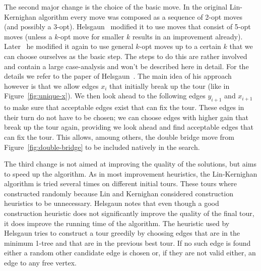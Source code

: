 \documentclass[titlepage, 12pt]{article}
\begin{document}
    The second major change is the choice of the basic move. In the original Lin-Kernighan algorithm
    every move was composed as a sequence of 2-opt moves (and possibly a 3-opt).
    Helsgaun~\cite{lkh1} modified it to use moves that consist of 5-opt moves (unless a $k$-opt move
    for smaller $k$ results in an improvement already). Later~\cite{lkh2} he modified it again to
    use general $k$-opt moves up to a certain $k$ that we can choose ourselves as the basic step.
    The steps to do this are rather involved and contain a large case-analysis and won't be
    described here in detail. For the details we refer to the paper of Helsgaun~\cite{lkh2}.
    The main idea of his approach however is that we allow edges $x_i$ that initially break up the
    tour (like in Figure~\ref{fig:unique-x}). We then look ahead to the following edges $y_{i+1}$
    and $x_{i+1}$ to make sure that acceptable edges exist that can fix the tour. These edges in
    their turn do not have to be chosen; we can choose edges with higher gain that break up the tour
    again, providing we look ahead and find acceptable edges that can fix the tour. This allows,
    amoung others, the double bridge move from Figure~\ref{fig:double-bridge} to be included
    natively in the search.


    The third change is not aimed at improving the quality of the solutions, but aims to speed up
    the algorithm.
    As in most improvement heuristics, the Lin-Kernighan algorithm is tried several times on
    different initial tours. These tours where constructed randomly because Lin and Kernighan
    considered construction heuristics to be unnecessary. Helsgaun notes that even though a good
    construction heuristic does not significantly improve the quality of the final tour, it does
    improve the running time of the algorithm.
    The heuristic used by Helsgaun tries to construct a tour greedily by choosing edges that are in
    the minimum 1-tree and that are in the previous best tour. If no such edge is found either a
    random other candidate edge is chosen or, if they are not valid either, an edge to any free
    vertex.
\end{document}
